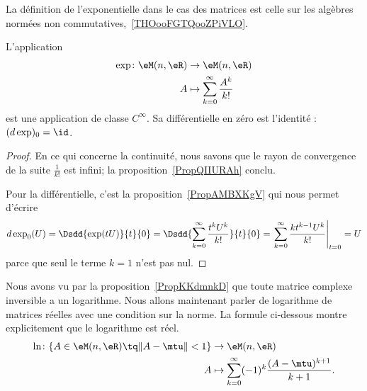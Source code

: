 La définition de l'exponentielle dans le cas des matrices est celle sur les algèbres normées non commutatives,~\ref{THOooFGTQooZPiVLO}.
\begin{proposition} \label{PropXFfOiOb}
    L'application
    \begin{equation}
        \begin{aligned}
            \exp\colon \eM(n,\eR)&\to \eM(n,\eR) \\
            A&\mapsto \sum_{k=0}^{\infty}\frac{ A^k }{ k! }
        \end{aligned}
    \end{equation}
    est une application de classe \(  C^{\infty}\). Sa différentielle en zéro est l'identité : \( (d\exp)_0=\id\).
\end{proposition}

\begin{proof}
    En ce qui concerne la continuité, nous savons que le rayon de convergence de la suite \( \frac{1}{ k! }\) est infini; la proposition~\ref{PropQIIURAh} conclu.

    Pour la différentielle, c'est la proposition~\ref{PropAMBXKgV} qui nous permet d'écrire
    \begin{equation}
        d\exp_0(U)=\Dsdd{ \exp(tU) }{t}{0}=\Dsdd{ \sum_{k=0}^{\infty}\frac{ t^kU^k }{ k! } }{t}{0}=\left. \sum_{k=0}^{\infty}\frac{ kt^{k-1}U^k }{ k! }\right|_{t=0}=U
    \end{equation}
    parce que seul le terme \( k=1\) n'est pas nul.
\end{proof}

Nous avons vu par la proposition~\ref{PropKKdmnkD} que toute matrice complexe inversible a un logarithme. Nous allons maintenant parler de logarithme de matrices réelles avec une condition sur la norme. La formule ci-dessous montre explicitement que le logarithme est réel.
\begin{equation}
    \begin{aligned}
        \ln\colon \{ A\in \eM(n,\eR)\tq \| A-\mtu \| <1 \}&\to \eM(n,\eR) \\
        A&\mapsto \sum_{k=0}^{\infty}(-1)^k\frac{ (A-\mtu)^{k+1} }{ k+1 }.
    \end{aligned}
\end{equation}

